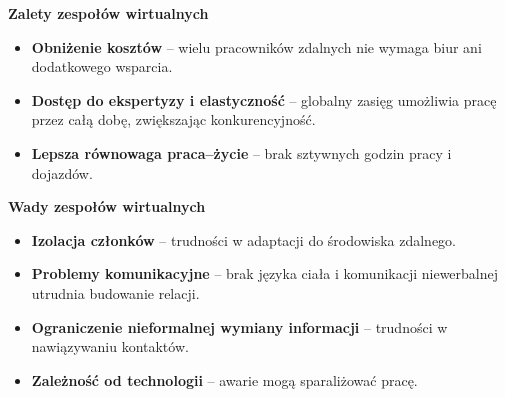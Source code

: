 \textbf{Zalety zespołów wirtualnych}  
\begin{itemize}
  \item \textbf{Obniżenie kosztów} – wielu pracowników zdalnych nie wymaga biur ani dodatkowego wsparcia.
  \item \textbf{Dostęp do ekspertyzy i elastyczność} – globalny zasięg umożliwia pracę przez całą dobę, zwiększając konkurencyjność.
  \item \textbf{Lepsza równowaga praca–życie} – brak sztywnych godzin pracy i dojazdów.
\end{itemize}

\textbf{Wady zespołów wirtualnych}  
\begin{itemize}
  \item \textbf{Izolacja członków} – trudności w adaptacji do środowiska zdalnego.
  \item \textbf{Problemy komunikacyjne} – brak języka ciała i komunikacji niewerbalnej utrudnia budowanie relacji.
  \item \textbf{Ograniczenie nieformalnej wymiany informacji} – trudności w nawiązywaniu kontaktów.
  \item \textbf{Zależność od technologii} – awarie mogą sparaliżować pracę.
\end{itemize}


